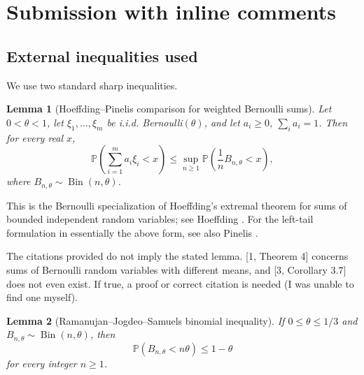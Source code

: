 \documentclass[12pt]{article}
\newtheorem{lemma}{Lemma}
\DeclareMathOperator{\Bin}{Bin}
\newcommand{\review}[1]{\begin{reviewbox}#1\end{reviewbox}}
\begin{document}
  \section{Submission with inline comments}


\date{}

\begin{abstract}
We determine all \(p\in[0,1]\) such that, for every finite probability vector
\((w_1,\ldots,w_m)\) and i.i.d. Bernoulli\((p)\) random variables
\(v_1,\ldots,v_m\), one has
\[
\mathbb P\!\left(\sum_{i=1}^m w_i v_i\ge p\right)\ge p.
\]
The answer is
\[
\boxed{\,p\in[0,1/3]\cup\{1/2,1\}\, }.
\]
\end{abstract}

\subsection*{External inequalities used}

We use two standard sharp inequalities.

\begin{lemma}[Hoeffding--Pinelis comparison for weighted Bernoulli sums]
\label{lem:hoeffding}
Let \(0<\theta<1\), let \(\xi_1,\ldots,\xi_m\) be i.i.d. Bernoulli\((\theta)\), and let
\(a_i\ge0\), \(\sum_i a_i=1\). Then for every real \(x\),
\[
\mathbb P\!\left(\sum_{i=1}^m a_i\xi_i<x\right)
\le
\sup_{n\ge1}
\mathbb P\!\left(\frac1n B_{n,\theta}<x\right),
\]
where \(B_{n,\theta}\sim \Bin(n,\theta)\).
\end{lemma}

This is the Bernoulli specialization of Hoeffding's extremal theorem for sums of
bounded independent random variables; see Hoeffding \cite[Theorem 4]{Hoeffding1956}.
For the left-tail formulation in essentially the above form, see also Pinelis
\cite[Corollary 3.7]{Pinelis2016}.

\review{The citations provided do not imply the stated lemma. [1, Theorem 4] concerns sums of Bernoulli random variables with different means, and [3, Corollary 3.7] does not even exist. If true, a proof or correct citation is needed (I was unable to find one myself).}

\begin{lemma}[Ramanujan--Jogdeo--Samuels binomial inequality]
\label{lem:binomial}
If \(0\le \theta\le 1/3\) and \(B_{n,\theta}\sim \Bin(n,\theta)\), then
\[
\mathbb P(B_{n,\theta}<n\theta)\le 1-\theta
\]
for every integer \(n\ge1\).
\end{lemma}
\end{document}

